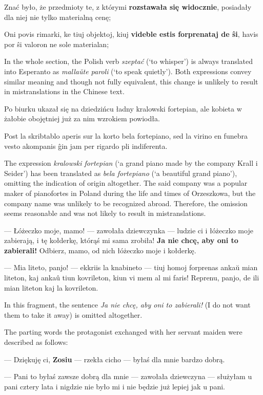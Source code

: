 Znać było, że przedmioty te, z którymi \textbf{rozstawała się widocznie}, posiadały dla niej nie tylko materialną cenę;

Oni povis rimarki, ke tiuj objektoj, kiuj \textbf{videble estis forprenataj de ŝi}, havis por ŝi valoron ne sole materialan;

In the whole section, the Polish verb \textit{szeptać} (`to whisper') is always translated into Esperanto as \textit{mallaŭte paroli} (`to speak quietly').
Both expressions convey similar meaning and though not fully equivalent, this change is unlikely to result in mistranslations in the Chinese text.

Po biurku ukazał się na dziedzińcu ładny kralowski fortepian, ale kobieta w żałobie obojętniej już za nim wzrokiem powiodła.

Post la skribtablo aperis sur la korto bela fortepiano, sed la virino en funebra vesto akompanis ĝin jam per rigardo pli indiferenta.

The expression \textit{kralowski fortepian} (`a grand piano made by the company Krall i Seider') has been translated as \textit{bela fortepiano} (`a beautiful grand piano'), omitting the indication of origin altogether.
The said company was a popular maker of pianofortes in Poland during the life and times of Orzeszkowa, but the company name was unlikely to be recognized abroad.
Therefore, the omission seems reasonable and was not likely to result in mistranslations.

--- Łóżeczko moje, mamo! --- zawołała dziewczynka --- ludzie ci i łóżeczko moje zabierają, i tę kołderkę, którąś mi sama zrobiła! \textbf{Ja nie chcę, aby oni to zabierali!} Odbierz, mamo, od nich łóżeczko moje i kołderkę.

--- Mia liteto, panjo! --- ekkriis la knabineto --- tiuj homoj forprenas ankaŭ mian liteton, kaj ankaû tiun kovrileton, kiun vi mem al mi faris! Reprenu, panjo, de ili mian liteton kaj la kovrileton.

In this fragment, the sentence \textit{Ja nie chcę, aby oni to zabierali!} (I do not want them to take it away) is omitted altogether.

The parting words the protagonist exchanged with her servant maiden were described as follows:

--- Dziękuję ci, \textbf{Zosiu} --- rzekła cicho --- byłaś dla mnie bardzo dobrą.

--- Pani to byłaś zawsze dobrą dla mnie --- zawołała dziewczyna --- służyłam u pani cztery lata i nigdzie nie było mi i nie będzie już lepiej jak u pani.

